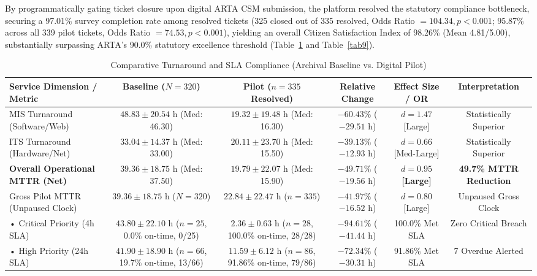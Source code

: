 \documentclass[conference]{IEEEtran}
\begin{document}
By programmatically gating ticket closure upon digital ARTA CSM submission, the platform resolved the statutory compliance bottleneck, securing a 97.01\% survey completion rate among resolved tickets (325 closed out of 335 resolved, Odds Ratio $= 104.34, p < 0.001$; 95.87\% across all 339 pilot tickets, Odds Ratio $= 74.53, p < 0.001$), yielding an overall Citizen Satisfaction Index of 98.26\% (Mean 4.81/5.00), substantially surpassing ARTA's 90.0\% statutory excellence threshold (Table~\ref{tab8} and Table~\ref{tab9}).

\begin{table}[t]
\caption{Comparative Turnaround and SLA Compliance (Archival Baseline vs. Digital Pilot)}
\label{tab8}
\centering
\small
\begin{tabularx}{\textwidth}{lccccc}
\toprule
\textbf{Service Dimension / Metric} & \textbf{Baseline ($N = 320$)} & \textbf{Pilot ($n = 335$ Resolved)} & \textbf{Relative Change} & \textbf{Effect Size / OR} & \textbf{Interpretation} \\
\midrule
MIS Turnaround (Software/Web) & $48.83 \pm 20.54\text{ h}$ (Med: 46.30) & $19.32 \pm 19.48\text{ h}$ (Med: 16.30) & $-60.43\%$ ($-29.51\text{ h}$) & $d = 1.47$ [Large] & Statistically Superior \\
ITS Turnaround (Hardware/Net) & $33.04 \pm 14.37\text{ h}$ (Med: 33.00) & $20.11 \pm 23.70\text{ h}$ (Med: 15.50) & $-39.13\%$ ($-12.93\text{ h}$) & $d = 0.66$ [Med-Large] & Statistically Superior \\
\textbf{Overall Operational MTTR (Net)} & \textbf{$39.36 \pm 18.75\text{ h}$} (Med: 37.50) & \textbf{$19.79 \pm 22.07\text{ h}$} (Med: 15.90) & \textbf{$-49.71\%$} ($-19.56\text{ h}$) & \textbf{$d = 0.95$ [Large]} & \textbf{49.7\% MTTR Reduction} \\
Gross Pilot MTTR (Unpaused Clock) & $39.36 \pm 18.75\text{ h}$ ($N = 320$) & $22.84 \pm 22.47\text{ h}$ ($n = 335$) & $-41.97\%$ ($-16.52\text{ h}$) & $d = 0.80$ [Large] & Unpaused Gross Clock \\
• Critical Priority (4h SLA) & $43.80 \pm 22.10\text{ h}$ ($n = 25$, 0.0\% on-time, 0/25) & $2.36 \pm 0.63\text{ h}$ ($n = 28$, 100.0\% on-time, 28/28) & $-94.61\%$ ($-41.44\text{ h}$) & 100.0\% Met SLA & Zero Critical Breach \\
• High Priority (24h SLA) & $41.90 \pm 18.90\text{ h}$ ($n = 66$, 19.7\% on-time, 13/66) & $11.59 \pm 6.12\text{ h}$ ($n = 86$, 91.86\% on-time, 79/86) & $-72.34\%$ ($-30.31\text{ h}$) & 91.86\% Met SLA & 7 Overdue Alerted \\

\end{tabularx}
\end{table}
\end{document}

